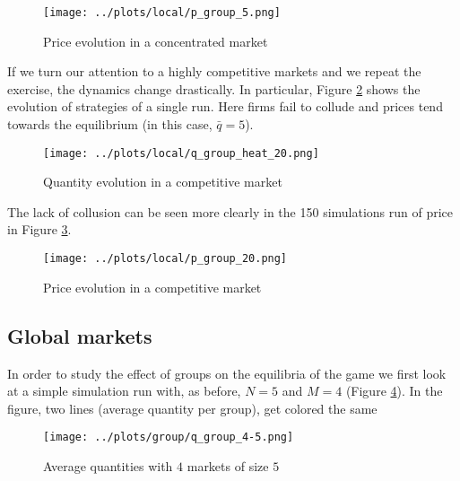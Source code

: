 \documentclass[american]{scrartcl}
\begin{document}
\begin{center}
    \begin{figure}[h!]
        \center
        \texttt{[image: ../plots/local/p\_group\_5.png]}
        \caption{Price evolution in a concentrated market}
        \label{fig:price_small_local}
    \end{figure}
\end{center}

If we turn our attention to a highly competitive markets and we repeat the exercise, the dynamics change drastically. In particular, Figure \ref{fig:large_local} shows the evolution of strategies of a single run. Here firms fail to collude and prices tend towards the equilibrium (in this case, $\bar{q} = 5$).

\begin{center}
    \begin{figure}[h!]
        \center
        \texttt{[image: ../plots/local/q\_group\_heat\_20.png]}
        \caption{Quantity evolution in a competitive market}
        \label{fig:large_local}
    \end{figure}
\end{center}

The lack of collusion can be seen more clearly in the 150 simulations run of price in Figure \ref{fig:price_large_local}.

\begin{center}
    \begin{figure}[h!]
        \center
        \texttt{[image: ../plots/local/p\_group\_20.png]}
        \caption{Price evolution in a competitive market}
        \label{fig:price_large_local}
    \end{figure}
\end{center}

\subsection{Global markets}

In order to study the effect of groups on the equilibria of the game we first look at a simple simulation run with, as before, $N = 5$ and $M = 4$ (Figure \ref{fig:small_avg}). In the figure, two lines (average quantity per group), get colored the same 

\begin{figure}[h!]
    \center
    \texttt{[image: ../plots/group/q\_group\_4-5.png]}
    \caption{Average quantities with $4$ markets of size $5$}
    \label{fig:small_avg}
\end{figure}
\end{document}
